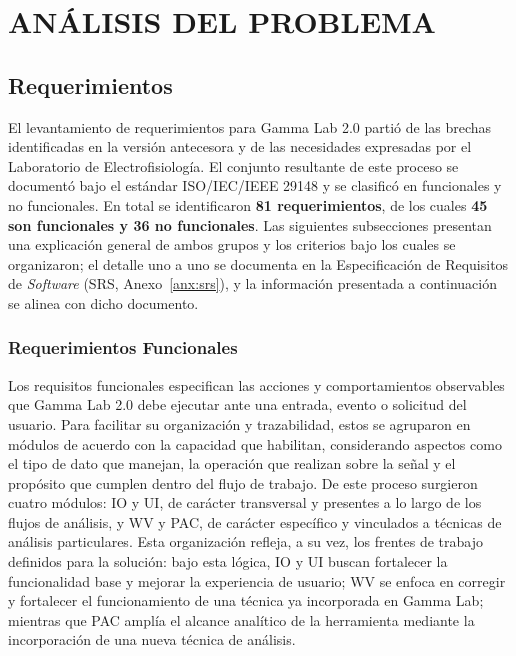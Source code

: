 \documentclass[12pt,letterpaper,oneside]{article}
\newcommand{\capitulo}[1]{\clearpage\section{#1}}
\begin{document}
\capitulo{ANÁLISIS DEL PROBLEMA}

\subsection{Requerimientos}

El levantamiento de requerimientos para Gamma Lab 2.0 partió de las brechas identificadas en la versión antecesora y de las necesidades expresadas por el Laboratorio de Electrofisiología. El conjunto resultante de este proceso se documentó bajo el estándar ISO/IEC/IEEE 29148 \cite{iso29148} y se clasificó en funcionales y no funcionales. En total se identificaron  \textbf{81 requerimientos}, de los cuales \textbf{45 son funcionales y 36 no funcionales}. Las siguientes subsecciones presentan una explicación general de ambos grupos y los criterios bajo los cuales se organizaron; el detalle uno a uno se documenta en la Especificación de Requisitos de \textit{Software} (SRS, Anexo~\ref{anx:srs}), y la información presentada a continuación se alinea con dicho documento.
\subsubsection{Requerimientos Funcionales}

Los requisitos funcionales especifican las acciones y comportamientos observables que Gamma Lab 2.0 debe ejecutar ante una entrada, evento o solicitud del usuario. Para facilitar su organización y trazabilidad, estos se agruparon en módulos de acuerdo con la capacidad que habilitan, considerando aspectos como el tipo de dato que manejan, la operación que realizan sobre la señal y el propósito que cumplen dentro del flujo de trabajo. De este proceso surgieron cuatro módulos: IO y UI, de carácter transversal y presentes a lo largo de los flujos de análisis, y WV y PAC, de carácter específico y vinculados a técnicas de análisis particulares. Esta organización refleja, a su vez, los frentes de trabajo definidos para la solución: bajo esta lógica, IO y UI buscan fortalecer la funcionalidad base y mejorar la experiencia de usuario; WV se enfoca en corregir y fortalecer el funcionamiento de una técnica ya incorporada en Gamma Lab; mientras que PAC amplía el alcance analítico de la herramienta mediante la incorporación de una nueva técnica de análisis.
\end{document}
